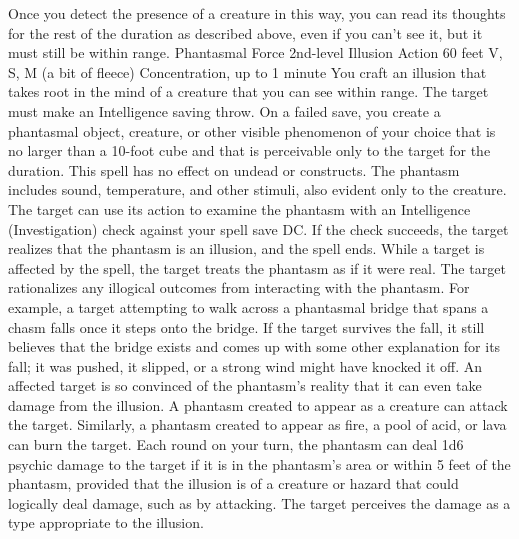 \documentclass[a4paper,10pt,bg=print]{dndbook} %
\begin{document}
	Once you detect the presence of a creature in this way, you can read its thoughts for the rest of the duration as described above, even if you can’t see it, but it must still be within range.\linebreak
	\pagebreak
	\DndSpellHeader
	{Phantasmal Force}
	{2nd-level Illusion}
	{Action}
	{60 feet}
	{V, S, M (a bit of fleece)}
	{Concentration, up to 1 minute}
	You craft an illusion that takes root in the mind of a creature that you can see within range. The target must make an Intelligence saving throw. On a failed save, you create a phantasmal object, creature, or other visible phenomenon of your choice that is no larger than a 10-foot cube and that is perceivable only to the target for the duration. This spell has no effect on undead or constructs.\linebreak
	The phantasm includes sound, temperature, and other stimuli, also evident only to the creature.\linebreak
	The target can use its action to examine the phantasm with an Intelligence (Investigation) check against your spell save DC. If the check succeeds, the target realizes that the phantasm is an illusion, and the spell ends.\linebreak
	While a target is affected by the spell, the target treats the phantasm as if it were real. The target rationalizes any illogical outcomes from interacting with the phantasm. For example, a target attempting to walk across a phantasmal bridge that spans a chasm falls once it steps onto the bridge. If the target survives the fall, it still believes that the bridge exists and comes up with some other explanation for its fall; it was pushed, it slipped, or a strong wind might have knocked it off.\linebreak
	An affected target is so convinced of the phantasm’s reality that it can even take damage from the illusion. A phantasm created to appear as a creature can attack the target. Similarly, a phantasm created to appear as fire, a pool of acid, or lava can burn the target. Each round on your turn, the phantasm can deal 1d6 psychic damage to the target if it is in the phantasm’s area or within 5 feet of the phantasm, provided that the illusion is of a creature or hazard that could logically deal damage, such as by attacking. The target perceives the damage as a type appropriate to the illusion.
\end{document}
